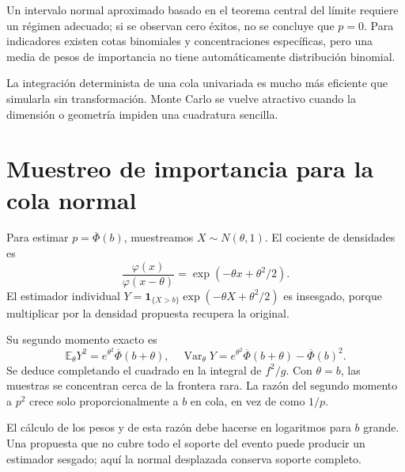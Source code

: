 \documentclass[11pt,a4paper]{article}
\newcommand{\E}{\mathbb E}
\newcommand{\ind}{\mathbf 1}
\DeclareMathOperator{\Var}{Var}
\theoremstyle{definition}
\newcommand{\ph}{\varphi}
\newcommand{\Q}{\overline\Phi}
\begin{document}
Un intervalo normal aproximado basado en el teorema central del límite requiere un régimen adecuado; si se observan cero éxitos, no se concluye que $p=0$. Para indicadores existen cotas binomiales y concentraciones específicas, pero una media de pesos de importancia no tiene automáticamente distribución binomial.

La integración determinista de una cola univariada es mucho más eficiente que simularla sin transformación. Monte Carlo se vuelve atractivo cuando la dimensión o geometría impiden una cuadratura sencilla.

\section{Muestreo de importancia para la cola normal}
Para estimar $p=\Q(b)$, muestreamos $X\sim N(\theta,1)$. El cociente de densidades es
\[
\frac{\ph(x)}{\ph(x-\theta)}
=\exp(-\theta x+\theta^2/2).
\]
El estimador individual
$Y=\ind_{\{X>b\}}\exp(-\theta X+\theta^2/2)$
es insesgado, porque multiplicar por la densidad propuesta recupera la original.

Su segundo momento exacto es
\[
\E_\theta Y^2=e^{\theta^2}\Q(b+\theta),
\quad \Var_\theta Y=e^{\theta^2}\Q(b+\theta)-\Q(b)^2.
\]
Se deduce completando el cuadrado en la integral de $f^2/g$. Con $\theta=b$, las muestras se concentran cerca de la frontera rara. La razón del segundo momento a $p^2$ crece solo proporcionalmente a $b$ en cola, en vez de como $1/p$.

El cálculo de los pesos y de esta razón debe hacerse en logaritmos para $b$ grande. Una propuesta que no cubre todo el soporte del evento puede producir un estimador sesgado; aquí la normal desplazada conserva soporte completo.
\end{document}
